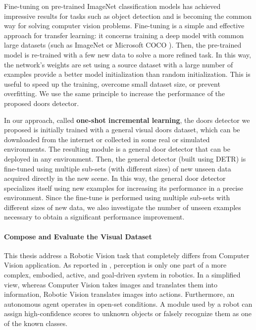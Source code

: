 Fine-tuning on pre-trained ImageNet classification models \cite{verydeepimagenet, resnet} has achieved impressive results for tasks such as object detection \cite{fasterrcnn, yolo, yolov2} and is becoming the common way for solving computer vision problems. Fine-tuning is a simple and effective
approach for transfer learning: it concerns training a deep model with common large datasets (such as ImageNet \cite{imagenet} or Microsoft COCO \cite{coco}). Then, the pre-trained model is re-trained with a few new data to solve a more refined task. In this way, the network's weights are set using a source dataset with a large number of examples provide a better
model initialization than random initialization. This is useful to speed up the training, overcome small dataset size, or prevent overfitting. We use the same principle to increase the performance of the proposed doors detector. 

In our approach, called \textbf{one-shot incremental learning}, the doors detector we proposed is initially trained with a general visual doors dataset, which can be downloaded from the internet or collected in some real or simulated environments. The resulting module is a general door detector that can be deployed in any environment. Then, the general detector (built using DETR) is fine-tuned using multiple sub-sets (with different sizes) of new unseen data acquired directly in the new scene. In this way, the general door detector specializes itself using new examples for increasing its performance in a precise environment. Since the fine-tune is performed using multiple sub-sets with different sizes of new data, we also investigate the number of unseen examples necessary to obtain a significant performance improvement.

\paragraph{Compose and Evaluate the Visual Dataset}
This thesis address a Robotic Vision task that completely differs from Computer Vision application. As reported in \cite{surveydeeplimits}, perception is only one part of a more complex, embodied, active, and goal-driven system in robotics.
In a simplified view, whereas Computer Vision takes images and translates them into information, Robotic Vision translates images into actions. Furthermore, an autonomous agent operates in open-set conditions. A module used by a robot can assign high-confidence scores to unknown objects or falsely recognize them as one of the known classes. 

